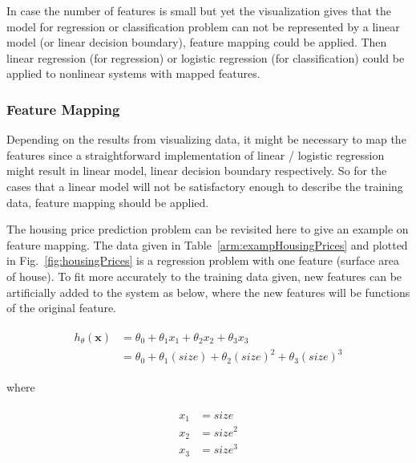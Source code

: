 In case the number of features is small but yet the visualization gives that the model for regression or classification problem can not be represented by a linear model (or linear decision boundary), feature mapping could be applied. 
Then linear regression (for regression) or logistic regression (for classification) could be applied to nonlinear systems with mapped features.  

\subsubsection{Feature Mapping}

Depending on the results from visualizing data, it might be necessary to map the features since a straightforward implementation of linear / logistic regression might result in linear model, linear decision boundary respectively. 
So for the cases that a linear model will not be satisfactory enough to describe the training data, feature mapping should be applied.

The housing price prediction problem can be revisited here to give an example on feature mapping.
The data given in Table~\ref{arm:exampHousingPrices} and plotted in Fig.~\ref{fig:housingPrices} is a regression problem with one feature (surface area of house).
To fit more accurately to the training data given, new features can be artificially added to the system as below, where the new features will be functions of the original feature.

\begin{align}
\label{eqn:costFuncExamp1}
\begin{split}
h_{\theta}(\bm{x}) & = \theta_0 + \theta_1 x_1 + \theta_2 x_2 + \theta_3 x_3
\\
& = \theta_0 + \theta_1 (size) + \theta_2 {(size)}^2 + \theta_3 {(size)}^3
\end{split}
\end{align}

where

\begin{align}
\label{eqn:featureMapping1}
\begin{split}
x_1 & = size
\\
x_2 & = size^2
\\
x_3 & = size^3
\end{split}
\end{align}

